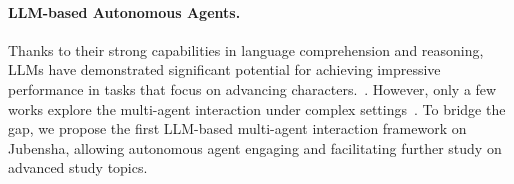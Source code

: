 \documentclass[11pt]{article}
\begin{document}

\paragraph{LLM-based Autonomous Agents.} 
Thanks to their strong capabilities in language comprehension and reasoning, LLMs have demonstrated significant potential for achieving impressive performance in tasks that focus on advancing characters.~\cite{wang2023survey, wei2022chain, wang2022self, yao2023tree, yao2022react, shinn2023reflexion}. However, only a few works explore the multi-agent interaction under complex settings~\cite{xu2023exploring,junprung2023exploring,lai2023werewolf}. To bridge the gap, we propose the first LLM-based multi-agent interaction framework on Jubensha, allowing autonomous agent engaging and facilitating further study on advanced study topics. 


\end{document}
